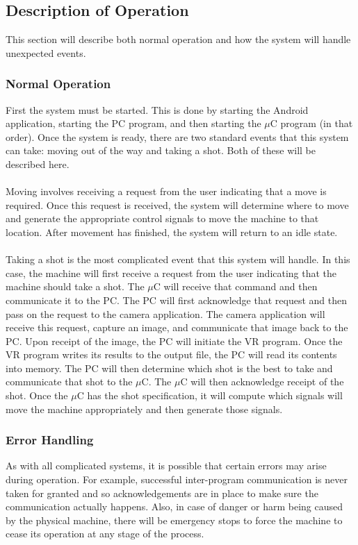 \documentclass[titlepage]{article}
\begin{document}
\subsection{Description of Operation}
This section will describe both normal operation and how the system will handle unexpected events.
\subsubsection{Normal Operation}
First the system must be started. This is done by starting the Android application, starting the PC program, and then starting the $\mu$C program (in that order). Once the system is ready, there are two standard events that this system can take: moving out of the way and taking a shot. Both of these will be described here.\\~\\
Moving involves receiving a request from the user indicating that a move is required. Once this request is received, the system will determine where to move and generate the appropriate control signals to move the machine to that location. After movement has finished, the system will return to an idle state.\\~\\
Taking a shot is the most complicated event that this system will handle. In this case, the machine will first receive a request from the user indicating that the machine should take a shot. The $\mu$C will receive that command and then communicate it to the PC. The PC will first acknowledge that request and then pass on the request to the camera application. The camera application will receive this request, capture an image, and communicate that image back to the PC. Upon receipt of the image, the PC will initiate the VR program. Once the VR program writes its results to the output file, the PC will read its contents into memory. The PC will then determine which shot is the best to take and communicate that shot to the $\mu$C. The $\mu$C will then acknowledge receipt of the shot. Once the $\mu$C has the shot specification, it will compute which signals will move the machine appropriately and then generate those signals.
\subsubsection{Error Handling}
As with all complicated systems, it is possible that certain errors may arise during operation. For example, successful inter-program communication is never taken for granted and so acknowledgements are in place to make sure the communication actually happens. Also, in case of danger or harm being caused by the physical machine, there will be emergency stops to force the machine to cease its operation at any stage of the process.
\end{document}
